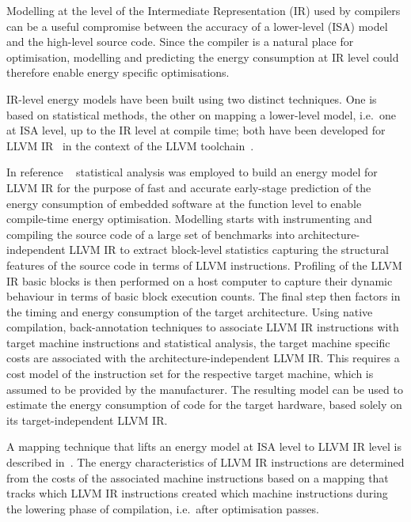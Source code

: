 \documentclass[oneside]{book}
\begin{document}
Modelling at the level of the Intermediate Representation (IR) used by
compilers can be a useful compromise between the accuracy of a lower-level
(ISA) model and the high-level source code. Since the compiler is a natural
place for optimisation, modelling and predicting the energy consumption at IR
level could therefore enable energy specific optimisations.

IR-level energy models have been built using two distinct techniques. One is
based on statistical methods, the other on mapping a lower-level model, i.e.\
one at ISA level, up to the IR level at compile time; both have been developed
for LLVM IR~\cite{LattnerLLVM2004} in the context of the LLVM
toolchain~\cite{LLVM}.

In reference ~\cite{Brandolese2011} statistical analysis was employed to build an
energy model for LLVM IR for the purpose of fast and accurate early-stage
prediction of the energy consumption of embedded software at the function level
to enable compile-time energy optimisation.
%
Modelling starts with instrumenting and compiling the source code of a large
set of benchmarks into architecture-independent LLVM IR to extract block-level
statistics capturing the structural features of the source code in terms of
LLVM instructions. 
%
Profiling of the LLVM IR basic blocks is then performed on a host computer to
capture their dynamic behaviour in terms of basic block execution counts. 
%
The final step then factors in the timing and energy consumption of the target
architecture. Using native compilation, back-annotation techniques to associate
LLVM IR instructions with target machine instructions and statistical analysis,
the target machine specific costs are associated with the
architecture-independent LLVM IR. This requires a cost model of the instruction
set for the respective target machine, which is assumed to be provided by the
manufacturer. The resulting model can be used to estimate the energy
consumption of code for the target hardware, based solely on its
target-independent LLVM IR.

A 
%
mapping technique that lifts an energy model at ISA level to LLVM IR
level is described in~\cite{DBLP:journals/corr/GeorgiouKE15}. The energy characteristics of LLVM IR
instructions are determined from the costs of the associated machine
instructions based on a mapping that tracks which LLVM IR instructions created
which machine instructions during the lowering phase of compilation, i.e.\
after optimisation passes. 
\end{document}
